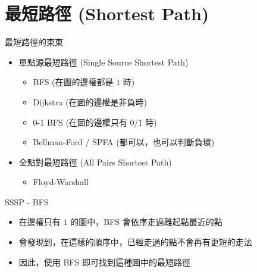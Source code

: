 \documentclass[aspectratio=169]{beamer}
\begin{document}
    \section{最短路徑 (Shortest Path)}
    
    \begin{frame}{最短路徑的東東}
        \begin{itemize}
            \item 單點源最短路徑 (Single Source Shortest Path)
                \begin{itemize}
                    \item BFS (在圖的邊權都是 $1$ 時)
                    \item Dijkstra (在圖的邊權是非負時)
                    \item 0-1 BFS (在圖的邊權只有 $0/1$ 時)
                    \item Bellman-Ford / SPFA (都可以，也可以判斷負環)
                \end{itemize}
            \item 全點對最短路徑 (All Pairs Shortest Path)
                \begin{itemize}
                    \item Floyd-Warshall 
                \end{itemize}
        \end{itemize}
    \end{frame}
    
    \begin{frame}{SSSP - BFS}
        \begin{itemize}
            \item 在邊權只有 $1$ 的圖中，BFS 會依序走過離起點最近的點
            \item 會發現到，在這樣的順序中，已經走過的點不會再有更短的走法
            \item 因此，使用 BFS 即可找到這種圖中的最短路徑
        \end{itemize}
    \end{frame}
    
\end{document}
